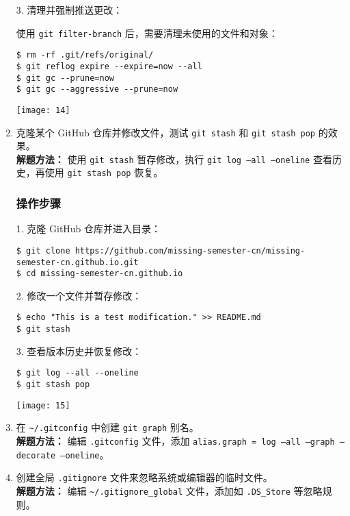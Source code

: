 \documentclass[12pt]{article}
\begin{document}
\begin{enumerate}
3. 清理并强制推送更改：

使用 \texttt{git filter-branch} 后，需要清理未使用的文件和对象：

\begin{verbatim}
$ rm -rf .git/refs/original/
$ git reflog expire --expire=now --all
$ git gc --prune=now
$ git gc --aggressive --prune=now
\end{verbatim}

\texttt{[image: 14]}
    
    \item 克隆某个 GitHub 仓库并修改文件，测试 \texttt{git stash} 和 \texttt{git stash pop} 的效果。\\
    \textbf{解题方法：} 使用 \texttt{git stash} 暂存修改，执行 \texttt{git log --all --oneline} 查看历史，再使用 \texttt{git stash pop} 恢复。
    \subsubsection*{操作步骤}

1. 克隆 GitHub 仓库并进入目录：

\begin{verbatim}
$ git clone https://github.com/missing-semester-cn/missing-semester-cn.github.io.git
$ cd missing-semester-cn.github.io
\end{verbatim}

2. 修改一个文件并暂存修改：

\begin{verbatim}
$ echo "This is a test modification." >> README.md
$ git stash
\end{verbatim}

3. 查看版本历史并恢复修改：

\begin{verbatim}
$ git log --all --oneline
$ git stash pop
\end{verbatim}
    \texttt{[image: 15]}
    
    \item 在 \texttt{\textasciitilde/.gitconfig} 中创建 \texttt{git graph} 别名。\\
    \textbf{解题方法：} 编辑 \texttt{.gitconfig} 文件，添加 \texttt{alias.graph = log --all --graph --decorate --oneline}。
    
    \item 创建全局 \texttt{.gitignore} 文件来忽略系统或编辑器的临时文件。\\
    \textbf{解题方法：} 编辑 \texttt{\textasciitilde/.gitignore\_global} 文件，添加如 \texttt{.DS\_Store} 等忽略规则。
  


\end{enumerate}
\end{document}
